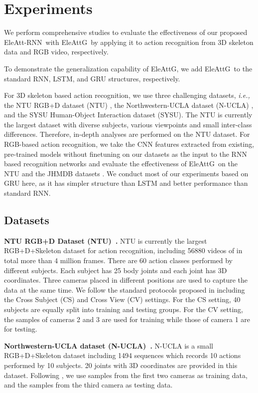 \documentclass[runningheads]{llncs}
\newcommand{\EleAttGn}{{EleAttG}}
\newcommand{\EleAttG}{{EleAttG~}}
\newcommand{\EARNN}{EleAtt-RNN}
\begin{document}
\section{Experiments}
We perform comprehensive studies to evaluate the effectiveness of our proposed \EARNN~with \EleAttG by applying it to action recognition from 3D skeleton data and RGB video, respectively. 

To demonstrate the generalization capability of \EleAttGn, we add \EleAttG to the standard RNN, LSTM, and GRU structures, respectively. 

For 3D skeleton based action recognition, we use three challenging datasets, {\it{i.e.},} the NTU RGB+D dataset (NTU) \cite{Shahroudy_2016_CVPR}, the Northwestern-UCLA dataset (N-UCLA) \cite{wang2014cross}, and the SYSU Human-Object Interaction dataset (SYSU)\cite{hu2015jointly}. The NTU is currently the largest dataset with diverse subjects, various viewpoints and small inter-class differences. Therefore, in-depth analyses are performed on the NTU dataset. For RGB-based action recognition, we take the CNN features extracted from existing, pre-trained models without finetuning on our datasets as the input to the RNN based recognition networks and evaluate the effectiveness of \EleAttG on the NTU and the JHMDB datasets \cite{jhuang2013towards}. We conduct most of our experiments based on GRU here, as it has simpler structure than LSTM and better performance than standard RNN. 



\subsection{Datasets}
\label{datasets}
\textbf{NTU RGB+D Dataset (NTU)~\cite{Shahroudy_2016_CVPR}.} NTU is currently the largest RGB+D+Skeleton dataset for action recognition, including 56880 videos of in total more than 4 million frames. There are 60 action classes performed by different subjects. Each subject has 25 body joints and each joint has 3D coordinates. Three cameras placed in different positions are used to capture the data at the same time. We follow the standard protocols proposed in \cite{Shahroudy_2016_CVPR} including the Cross Subject (CS) and Cross View (CV) settings. For the CS setting, 40 subjects are equally split into training and testing groups. For the CV setting, the samples of cameras 2 and 3 are used for training while those of camera 1 are for testing. 


\textbf{Northwestern-UCLA dataset (N-UCLA)~\cite{wang2014cross}.} N-UCLA is a small RGB+D+Skeleton dataset including 1494 sequences which records 10 actions performed by 10 subjects. 20 joints with 3D coordinates are provided in this dataset. Following \cite{wang2014cross}, we
use samples from the first two cameras as training data, and the
samples from the third camera as testing data. 
\end{document}
